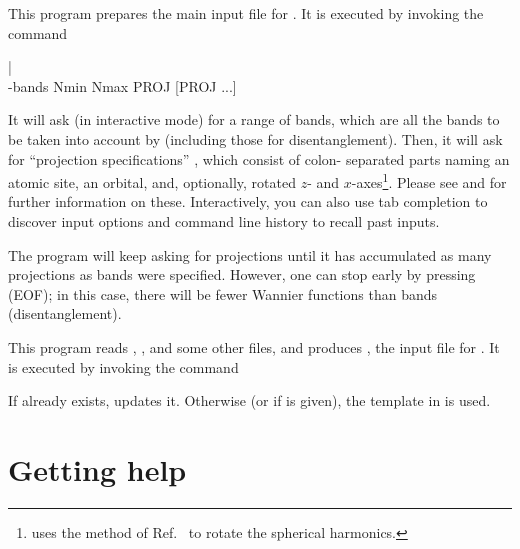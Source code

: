 This program prepares the main input file  for
\wiiw.  It is executed by invoking the command
%
\begin{usage}
  \writeinwf {} |
  \\
  \writeinwf{} -bands Nmin Nmax PROJ [PROJ ...]
\end{usage}
%
It will ask (in interactive mode) for a range of bands, which are all
the bands to be taken into account by \wiiw (including those for
disentanglement).  Then, it will ask for ``projection specifications''
, which consist of colon-
separated parts naming an atomic site, an orbital, and, optionally,
rotated $z$- and $x$-axes\footnote{\writeinwf uses the method of
  Ref.~\cite{ylmrot} to rotate the spherical harmonics.}.  Please see
 and 
for further information on these.  Interactively, you can also use tab
completion to discover input options and command line history to
recall past inputs.

The program will keep asking for projections until it has accumulated
as many projections as bands were specified.  However, one can stop
early by pressing  (EOF); in this case, there will be
fewer Wannier functions than bands (disentanglement).






This program reads , , and some
other files, and produces , the input file for
\wannierx.  It is executed by invoking the command
%
\begin{usage}
  \writewin [-fresh]
\end{usage}

If  already exists,  updates it.
Otherwise (or if  is given), the template in
 is used.


\chapter{Getting help}

